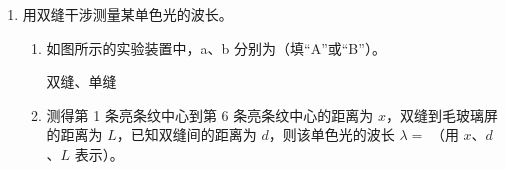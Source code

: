 \documentclass[\gkver]{gaokaozhenti}
\begin{document}
\begin{enumerate}
{	$qEx' - mgx' - \frac{1}{2}fx' = \frac{1}{2} \cdot 2mv^{2}$

	得 $mv^{2} = -(x' - 1)^{2} + 1$

	即：当 $x' = 1 \Um$ 时，$v$ 最大为 $1 \Ums$，故 A 正确，B 错误；

	C．当 $v = 0.6 \Ums$ 时，可得 $x = 0.2 \Um$ 或 $1.8 \Um$

	当 $x = 0.2 \Um$ 时，电场力做功 $qEx = 2.4 \UJ$

	则电势能减小 $2.4 \UJ$，由于 $E_{pO} = 0$，则电势能为 $-2.4 \UJ$，当 $x = 1.8 \Um$ 时

	$E_{pO} = -21.6 \UJ$

	故 C 正确；

	D．根据牛顿第二定律 $qE - f - mg = ma$

	当 $x = 0.2 \Um$ 时，系统加速度 $a = 0.8 \Umsq$

	对 B 有 $T - mg = ma$，得 $T = 10.8 \UN$。

	当 $x = 1.8 \Um$ 时，系统加速度 $a = -0.8 \Umsq$

	对 B 分析可得 $T = 9.2 \UN$。

	故 D 正确。

	故选 ACD。
}

\item
用双缝干涉测量某单色光的波长。

\begin{enumerate}
	\item
	如图所示的实验装置中，a、b 分别为（填“A”或“B”）。

	{双缝、单缝}
	\item
	测得第 1 条亮条纹中心到第 6 条亮条纹中心的距离为 $x$，双缝到毛玻璃屏的距离为 $L$，已知双缝间的距离为 $d$，则该单色光的波长 $\lambda =$ （用 $x$、$d$、$L$ 表示）。
\end{enumerate}


\end{enumerate}
\end{document}
